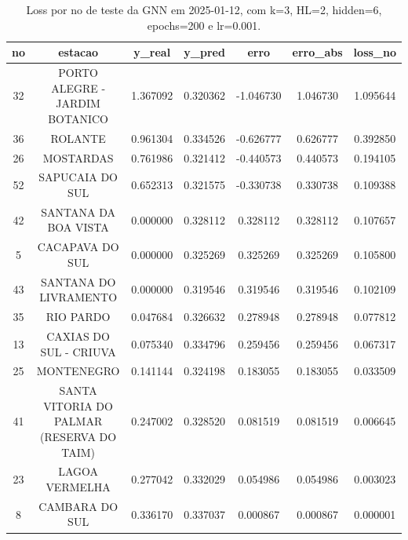\begin{table}[h]
\centering
\caption{Loss por no de teste da GNN em 2025-01-12, com k=3, HL=2, hidden=6, epochs=200 e lr=0.001.}
\label{tab:gnn_loss_k3_hl2_h6_e200_d20250112}
\begin{tabular}{ccccccc}
\toprule
no & estacao & y\_real & y\_pred & erro & erro\_abs & loss\_no \\
\midrule
32 & PORTO ALEGRE - JARDIM BOTANICO & 1.367092 & 0.320362 & -1.046730 & 1.046730 & 1.095644 \\
36 & ROLANTE & 0.961304 & 0.334526 & -0.626777 & 0.626777 & 0.392850 \\
26 & MOSTARDAS & 0.761986 & 0.321412 & -0.440573 & 0.440573 & 0.194105 \\
52 & SAPUCAIA DO SUL & 0.652313 & 0.321575 & -0.330738 & 0.330738 & 0.109388 \\
42 & SANTANA DA BOA VISTA & 0.000000 & 0.328112 & 0.328112 & 0.328112 & 0.107657 \\
5 & CACAPAVA DO SUL & 0.000000 & 0.325269 & 0.325269 & 0.325269 & 0.105800 \\
43 & SANTANA DO LIVRAMENTO & 0.000000 & 0.319546 & 0.319546 & 0.319546 & 0.102109 \\
35 & RIO PARDO & 0.047684 & 0.326632 & 0.278948 & 0.278948 & 0.077812 \\
13 & CAXIAS DO SUL - CRIUVA & 0.075340 & 0.334796 & 0.259456 & 0.259456 & 0.067317 \\
25 & MONTENEGRO & 0.141144 & 0.324198 & 0.183055 & 0.183055 & 0.033509 \\
41 & SANTA VITORIA DO PALMAR (RESERVA DO TAIM) & 0.247002 & 0.328520 & 0.081519 & 0.081519 & 0.006645 \\
23 & LAGOA VERMELHA & 0.277042 & 0.332029 & 0.054986 & 0.054986 & 0.003023 \\
8 & CAMBARA DO SUL & 0.336170 & 0.337037 & 0.000867 & 0.000867 & 0.000001 \\
\bottomrule
\end{tabular}
\end{table}

